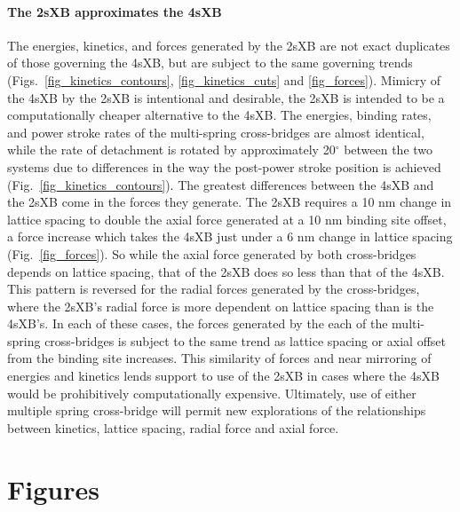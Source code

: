 \documentclass[]{article}
\begin{document}
\paragraph{The 2sXB approximates the 4sXB} %
The energies, kinetics, and forces generated by the 2sXB are not exact duplicates of those governing the 4sXB, but are subject to the same governing trends (Figs.~\ref{fig_kinetics_contours}, \ref{fig_kinetics_cuts} and \ref{fig_forces}). 
Mimicry of the 4sXB by the 2sXB is intentional and desirable, the 2sXB is intended to be a computationally cheaper alternative to the 4sXB\@. 
The energies, binding rates, and power stroke rates of the multi-spring cross-bridges are almost identical, while the rate of detachment is rotated by approximately 20$^\circ$ between the two systems due to differences in the way the post-power stroke position is achieved (Fig.~\ref{fig_kinetics_contours}).
The greatest differences between the 4sXB and the 2sXB come in the forces they generate.
The 2sXB requires a 10 nm change in lattice spacing to double the axial force generated at a 10 nm binding site offset, a force increase which takes the 4sXB just under a 6 nm change in lattice spacing (Fig.~\ref{fig_forces}). 
So while the axial force generated by both cross-bridges depends on lattice spacing, that of the 2sXB does so less than that of the 4sXB\@.
This pattern is reversed for the radial forces generated by the cross-bridges, where the 2sXB's radial force is more dependent on lattice spacing than is the 4sXB's.
In each of these cases, the forces generated by the each of the multi-spring cross-bridges is subject to the same trend as lattice spacing or axial offset from the binding site increases.
This similarity of forces and near mirroring of energies and kinetics lends support to use of the 2sXB in cases where the 4sXB would be prohibitively computationally expensive.
Ultimately, use of either multiple spring cross-bridge will permit new explorations of the relationships between kinetics, lattice spacing, radial force and axial force.



\clearpage
\section*{Figures} %
\end{document}
